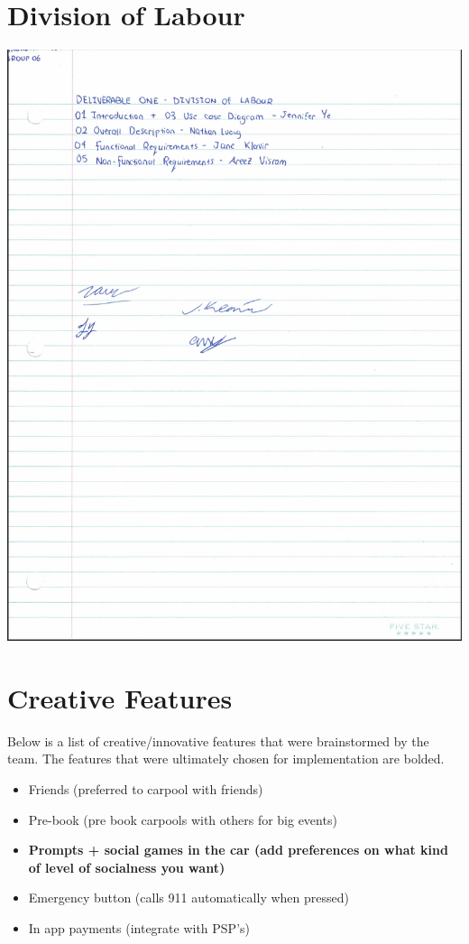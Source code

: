 \documentclass[]{article}
\begin{document}


\newpage
\appendix
\section{Division of Labour}
\label{sec:division_of_labour}
\includegraphics[scale=0.75]{division_of_labour.png}

\section{Creative Features}
\label{sec:creative_features}
Below is a list of creative/innovative features that were brainstormed by the team. The features that were ultimately chosen for implementation are bolded.
\begin{itemize}
	\item Friends (preferred to carpool with friends)
	\item Pre-book (pre book carpools with others for big events)
	\item \textbf{Prompts + social games in the car (add preferences on what kind of level of socialness you want)} 
	\item Emergency button (calls 911 automatically when pressed)
	\item In app payments (integrate with PSP's) 

\end{itemize}
\end{document}
